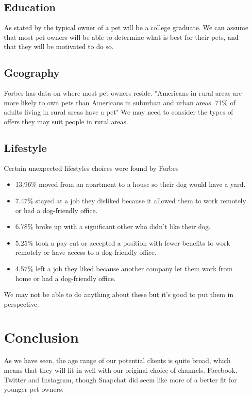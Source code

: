 \documentclass{article}
\begin{document}
\subsection{Education}
As stated by \cite{data} the typical owner of a pet will be a college graduate. We can assume that most pet owners will be able to determine what is best for their pets, and that they will be motivated to do so.

\subsection{Geography}
Forbes has data on where most pet owners reside. "Americans in rural areas are more likely to own pets than Americans in suburban and urban areas. 71\% of adults living in rural areas have a pet" \cite{forbes} We may need to consider the types of offers they may suit people in rural areas.

\subsection{Lifestyle}
Certain unexpected lifestyles choices were found by Forbes \cite{forbes}
\begin{itemize}
    \item 13.96\% moved from an apartment to a house so their dog would have a yard.
    \item 7.47\% stayed at a job they disliked because it allowed them to work remotely or had a dog-friendly office.
    \item 6.78\% broke up with a significant other who didn’t like their dog.
    \item 5.25\% took a pay cut or accepted a position with fewer benefits to work remotely or have access to a dog-friendly office.
    \item 4.57\% left a job they liked because another company let them work from home or had a dog-friendly office.
\end{itemize}
We may not be able to do anything about these but it's good to put them in perspective.

\section{Conclusion}
As we have seen, the age range of our potential clients is quite broad, which means that they will fit in well with our original choice of channels, Facebook, Twitter and Instagram, though Snapchat did seem like more of a better fit for younger pet owners.
\end{document}

